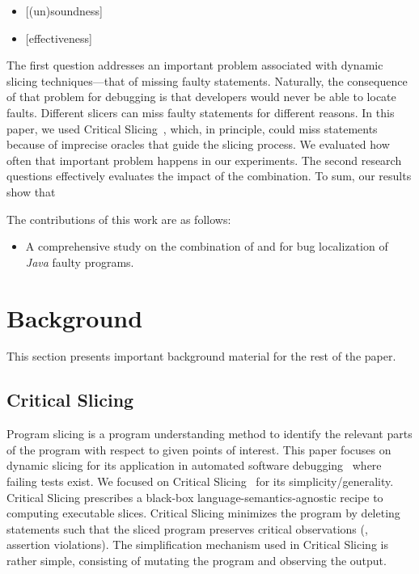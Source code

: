 \documentclass{article}
\begin{document}
\begin{itemize}[leftmargin=*]
\item[]{\footnotesize[(un)soundness]}~\textit{\rqone{}}
\item[]{\footnotesize[effectiveness]}~\textit{\rqthree{}}
\end{itemize}

The first question addresses an important problem associated with
dynamic slicing techniques---that of missing faulty
statements. Naturally, the consequence of that problem for debugging
is that developers would never be able to locate faults. Different
slicers can miss faulty statements for different reasons. In this
paper, we used Critical Slicing~\cite{DeMillo:1996:CSS:229000.226310},
which, in principle, could miss statements because of imprecise
oracles that guide the slicing process. We evaluated how often that
important problem happens in our experiments. The second research
questions effectively evaluates the impact of the combination. To sum,
our results show that 

The contributions of this work are as follows:
\begin{itemize}
	\item A comprehensive study on the combination of \sfl{} and \ds{}
     for bug localization of \emph{Java} faulty programs.
\end{itemize}

\section{Background}
\label{sec:background}

This section presents important background material for the rest of the paper.

\subsection{Critical Slicing}
\label{sec:slicing}

Program slicing is a program understanding method to identify the
relevant parts of the program with respect to given points of
interest.  This paper focuses on dynamic slicing
for its application in automated software
debugging~\cite{Binkley:2014:OLP:2635868.2635893} where failing tests
exist. We focused on Critical
Slicing~\cite{DeMillo:1996:CSS:229000.226310} for its
simplicity/generality. Critical Slicing
prescribes a black-box language-semantics-agnostic recipe to computing
executable slices.  Critical Slicing minimizes the program by deleting
statements such that the sliced program preserves critical
observations (\eg{}, assertion violations). The simplification
mechanism used in Critical Slicing is rather simple, consisting of
mutating the program and observing the output.
\end{document}
